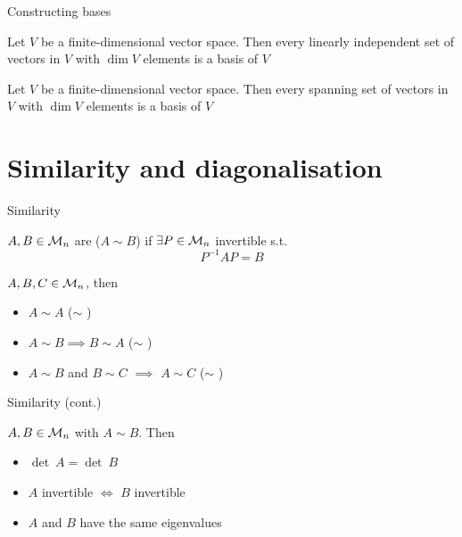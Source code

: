 \documentclass[aspectratio=169]{beamer}\usepackage[]{graphicx}\usepackage[]{xcolor}
\begin{document}
\begin{frame}{Constructing bases}
	\begin{theorem}
		Let $V$ be a finite-dimensional vector space. Then every linearly independent set of vectors in $V$ with $\dim V$ elements is a basis of $V$
	\end{theorem}
	\vfill
	\begin{theorem}
		Let $V$ be a finite-dimensional vector space. Then every spanning set of vectors in $V$ with $\dim V$ elements is a basis of $V$
	\end{theorem}
\end{frame}



\section{Similarity and diagonalisation}

\begin{frame}{Similarity}
\begin{definition}[Similarity]
$A,B\in\mathcal{M}_n$ are  ($A\sim B$) if $\exists P\in\mathcal{M}_n$ invertible s.t.
\[
P^{-1}AP=B
\]
\end{definition}
\begin{theorem}
$A,B,C\in\mathcal{M}_n$, then
\begin{itemize}
	\item $A\sim A$ \hfill ($\sim$ )
	\item $A\sim B\implies B\sim A$ \hfill ($\sim$ )
	\item $A\sim B$ and $B\sim C$ $\implies$ $A\sim C$ \hfill ($\sim$ )
\end{itemize}
\end{theorem}
\end{frame}

\begin{frame}{Similarity (cont.)}
\begin{importanttheorem}
$A,B\in\mathcal{M}_n$ with $A\sim B$. Then
\begin{itemize}
	\item $\det\ A=\det\ B$
	\item $A$ invertible $\iff$ $B$ invertible
	\item $A$ and $B$ have the same eigenvalues
\end{itemize}
\end{importanttheorem}
\end{frame}
\end{document}
